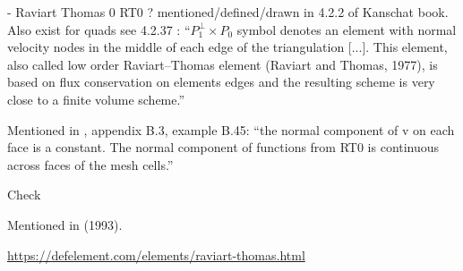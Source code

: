 
- Raviart Thomas 0 RT0 \cite{rath77} ? mentioned/defined/drawn in 4.2.2 of 
Kanschat book. Also exist for quads see 4.2.37 
\textcite{hald03}: ``$P_1^\perp \times P_0$ symbol denotes an element with 
normal velocity nodes in the middle of each edge of the
triangulation [...]. This element, also called low order Raviart–Thomas element 
(Raviart and Thomas, 1977), is based on flux conservation on elements edges and 
the resulting scheme is very close to a finite volume scheme.''

Mentioned in \textcite{john16}, appendix B.3, example B.45: ``the normal component of v 
on each face is a constant. The normal component of functions from RT0 is
continuous across faces of the mesh cells.''

Check \textcite{brfo}

Mentioned in \textcite{chen93a} (1993).

\url{https://defelement.com/elements/raviart-thomas.html}
